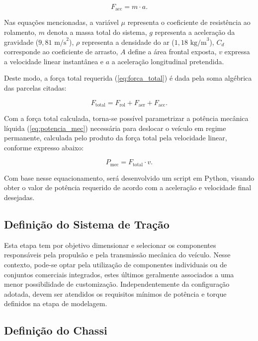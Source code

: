 \documentclass[conference]{IEEEtran}
\begin{document}
\begin{equation}
    F_{\text{acc}} = m \cdot a.
    \label{eq:forca_acc}
\end{equation}

Nas equações mencionadas, a variável $\mu$ representa o coeficiente de resistência ao rolamento, $m$ denota a massa total do sistema, $g$ representa a aceleração da gravidade ($9{,}81\text{ m/s}^2$), $\rho$ representa a densidade do ar ($1{,}18\text{ kg/m}^3$), $C_d$ corresponde ao coeficiente de arrasto, $A$ define a área frontal exposta, $v$ expressa a velocidade linear instantânea e $a$ a aceleração longitudinal pretendida. 

Deste modo, a força total requerida (\ref{eq:forca_total}) é dada pela soma algébrica das parcelas citadas:

\begin{equation}
    F_{\text{total}} = F_{\text{rol}} + F_{\text{aer}} + F_{\text{acc}}.
    \label{eq:forca_total}
\end{equation}

Com a força total calculada, torna-se possível parametrizar a potência mecânica líquida (\ref{eq:potencia_mec}) necessária para deslocar o veículo em regime permanente, calculada pelo produto da força total pela velocidade linear, conforme expresso abaixo:

\begin{equation}
    P_{\text{mec}} = F_{\text{total}} \cdot v.
    \label{eq:potencia_mec}
\end{equation}

Com base nesse equacionamento, será desenvolvido um script em Python, visando obter o valor de potência requerido de acordo com a aceleração e velocidade final desejadas.


\subsection{Definição do Sistema de Tração}

Esta etapa tem por objetivo dimensionar e selecionar os componentes responsáveis pela propulsão e pela transmissão mecânica do veículo. Nesse contexto, pode-se optar pela utilização de componentes individuais ou de conjuntos comerciais integrados, estes últimos geralmente associados a uma menor possibilidade de customização. Independentemente da configuração adotada, devem ser atendidos os requisitos mínimos de potência e torque definidos na etapa de modelagem.


\subsection{Definição do Chassi}
\end{document}
